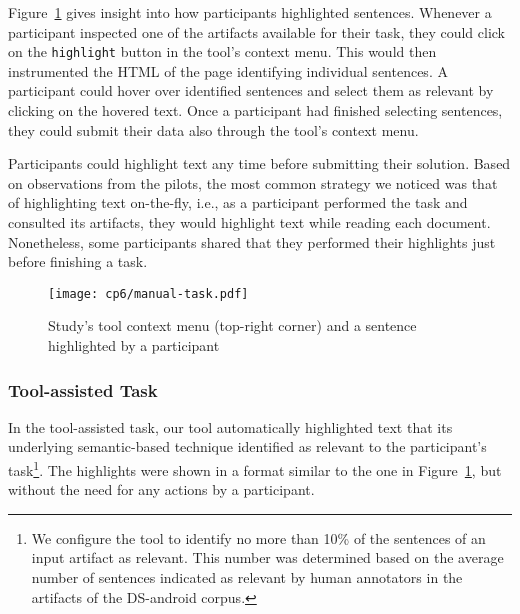 Figure~\ref{fig:artifact-pre-highlight}
gives insight into how participants highlighted sentences. 
Whenever a participant inspected one of the artifacts available for their task, 
they could click on the \texttt{highlight} button in the tool's context menu.  
This would then instrumented the HTML of the page identifying individual sentences. 
A participant could hover over identified sentences and select them as relevant by clicking on the hovered text.
Once a participant had finished selecting sentences, they could submit 
their data also through the tool's context menu.

Participants could highlight text any time before submitting their solution. 
Based on observations from the pilots, the most common strategy we noticed was that of highlighting 
text on-the-fly, i.e., as a participant performed the task and consulted its artifacts, they would highlight text 
while reading each document. Nonetheless, some participants 
shared that they performed their highlights just before finishing a task.





\begin{figure}
    \centering
    \texttt{[image: cp6/manual-task.pdf]}
    \caption{Study's tool context menu (top-right corner) and a sentence highlighted by a participant}
    \label{fig:artifact-pre-highlight}
\end{figure}




\subsubsection{Tool-assisted Task}
\label{cp6:procedures-tool-assisted}


In the tool-assisted task, our tool automatically highlighted text that 
its underlying semantic-based technique identified as relevant to the participant's task\footnote{
    We configure the tool to identify no more than 10\% of the sentences of an input artifact as relevant.
    This number was determined based on the average number of sentences indicated as relevant by human annotators in the artifacts of the \acs{DS-android} corpus.
}.
The highlights were shown in a format similar to the one in Figure~\ref{fig:artifact-pre-highlight}, but without the need for any actions by a participant.




